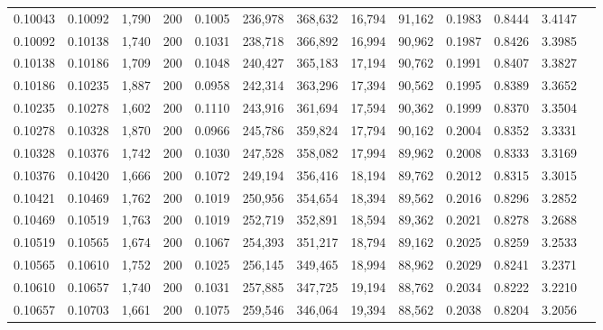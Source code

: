 \begin{tabular}{rrrrrrrrrrrrr}
0.10043 & 0.10092 & 1,790 & 200 &                                     0.1005 & 236,978 & 368,632 &  16,794 &  91,162 & 0.1983 & 0.8444 & 3.4147 \\
0.10092 & 0.10138 & 1,740 & 200 &                                     0.1031 & 238,718 & 366,892 &  16,994 &  90,962 & 0.1987 & 0.8426 & 3.3985 \\
0.10138 & 0.10186 & 1,709 & 200 &                                     0.1048 & 240,427 & 365,183 &  17,194 &  90,762 & 0.1991 & 0.8407 & 3.3827 \\
0.10186 & 0.10235 & 1,887 & 200 &                                     0.0958 & 242,314 & 363,296 &  17,394 &  90,562 & 0.1995 & 0.8389 & 3.3652 \\
0.10235 & 0.10278 & 1,602 & 200 &                                     0.1110 & 243,916 & 361,694 &  17,594 &  90,362 & 0.1999 & 0.8370 & 3.3504 \\
0.10278 & 0.10328 & 1,870 & 200 &                                     0.0966 & 245,786 & 359,824 &  17,794 &  90,162 & 0.2004 & 0.8352 & 3.3331 \\
0.10328 & 0.10376 & 1,742 & 200 &                                     0.1030 & 247,528 & 358,082 &  17,994 &  89,962 & 0.2008 & 0.8333 & 3.3169 \\
0.10376 & 0.10420 & 1,666 & 200 &                                     0.1072 & 249,194 & 356,416 &  18,194 &  89,762 & 0.2012 & 0.8315 & 3.3015 \\
0.10421 & 0.10469 & 1,762 & 200 &                                     0.1019 & 250,956 & 354,654 &  18,394 &  89,562 & 0.2016 & 0.8296 & 3.2852 \\
0.10469 & 0.10519 & 1,763 & 200 &                                     0.1019 & 252,719 & 352,891 &  18,594 &  89,362 & 0.2021 & 0.8278 & 3.2688 \\
0.10519 & 0.10565 & 1,674 & 200 &                                     0.1067 & 254,393 & 351,217 &  18,794 &  89,162 & 0.2025 & 0.8259 & 3.2533 \\
0.10565 & 0.10610 & 1,752 & 200 &                                     0.1025 & 256,145 & 349,465 &  18,994 &  88,962 & 0.2029 & 0.8241 & 3.2371 \\
0.10610 & 0.10657 & 1,740 & 200 &                                     0.1031 & 257,885 & 347,725 &  19,194 &  88,762 & 0.2034 & 0.8222 & 3.2210 \\
0.10657 & 0.10703 & 1,661 & 200 &                                     0.1075 & 259,546 & 346,064 &  19,394 &  88,562 & 0.2038 & 0.8204 & 3.2056 \\

\end{tabular}
